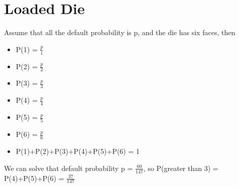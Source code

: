 \documentclass[12pt]{article}
\begin{document}
\section{Loaded Die}
Assume that all the default probability is p, and the die has six faces, then
\begin{itemize}
    \item P(1) = $\frac{p}{1}$
    \item P(2) = $\frac{p}{2}$
    \item P(3) = $\frac{p}{3}$
    \item P(4) = $\frac{p}{4}$
    \item P(5) = $\frac{p}{5}$
    \item P(6) = $\frac{p}{6}$
    \item P(1)+P(2)+P(3)+P(4)+P(5)+P(6) = 1
\end{itemize}
We can solve that default probability p = $\frac{60}{147}$, so P(greater than 3) = P(4)+P(5)+P(6) = $\frac{37}{147}$
\end{document}
